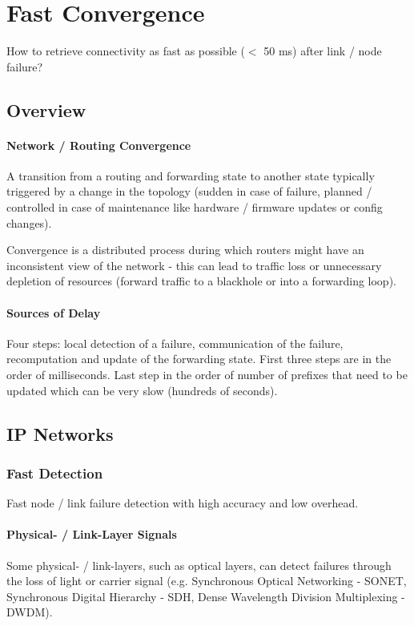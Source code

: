 \section{Fast Convergence}

How to retrieve connectivity as fast as possible ($<$ 50 ms) after link / node failure?

\subsection{Overview}

\paragraph{Network / Routing Convergence}
A transition from a routing and forwarding state to another state typically triggered by a change in the topology (sudden in case of failure, planned / controlled in case of maintenance like hardware / firmware updates or config changes).

Convergence is a distributed process during which routers might have an inconsistent view of the network - this can lead to traffic loss or unnecessary depletion of resources (forward traffic to a blackhole or into a forwarding loop).

\paragraph{Sources of Delay}
Four steps: local detection of a failure, communication of the failure, recomputation and update of the forwarding state. First three steps are in the order of milliseconds. Last step in the order of number of prefixes that need to be updated which can be very slow (hundreds of seconds).


\subsection{IP Networks}


\subsubsection{Fast Detection}

Fast node / link failure detection with high accuracy and low overhead.

\paragraph{Physical- / Link-Layer Signals}
Some physical- / link-layers, such as optical layers, can detect failures through the loss of light or carrier signal (e.g. Synchronous Optical Networking - SONET, Synchronous Digital Hierarchy - SDH, Dense Wavelength Division Multiplexing - DWDM).

